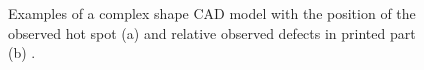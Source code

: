\begin{figure}
    \centering
    \qquad
    \caption[Examples of hot spot defects.]{Examples of a complex shape CAD model with the position of the observed hot spot (a) and relative observed defects in printed part (b) \cite{grasso_-process_2017}.}
    \label{fig:complexhs}
\end{figure}
